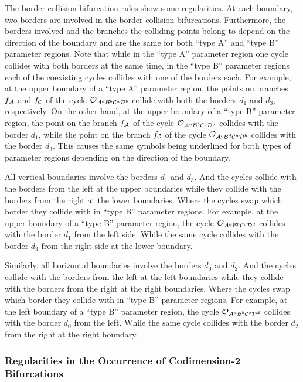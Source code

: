 The border collision bifurcation rules show some regularities.
At each boundary, two borders are involved in the border collision bifurcations.
Furthermore, the borders involved and the branches the colliding points belong to depend on the direction of the boundary and are the same for both ``type A'' and ``type B'' parameter regions.
Note that while in the ``type A'' parameter region one cycle collides with both borders at the same time, in the ``type B'' parameter regions each of the coexisting cycles collides with one of the borders each.
For example, at the upper boundary of a ``type A'' parameter region, the points on branches $f_{\mathcal{A}}$ and $f_{\mathcal{C}}$ of the cycle $\mathcal{O}_{\mathcal{A}^a\mathcal{B}^b\mathcal{C}^a\mathcal{D}^b}$ collide with both the borders $d_1$ and $d_3$, respectively.
On the other hand, at the upper boundary of a ``type B'' parameter region, the point on the branch $f_{\mathcal{A}}$ of the cycle $\mathcal{O}_{\mathcal{A}^a\mathcal{B}^b\mathcal{C}^c\mathcal{D}^d}$ collides with the border $d_1$, while the point on the branch $f_{\mathcal{C}}$ of the cycle $\mathcal{O}_{\mathcal{A}^c\mathcal{B}^d\mathcal{C}^a\mathcal{D}^b}$ collides with the border $d_3$.
This causes the same symbols being underlined for both types of parameter regions depending on the direction of the boundary.

All vertical boundaries involve the borders $d_1$ and $d_3$.
And the cycles collide with the borders from the left at the upper boundaries while they collide with the borders from the right at the lower boundaries.
Where the cycles swap which border they collide with in ``type B'' parameter regions.
For example, at the upper boundary of a ``type B'' parameter region, the cycle $\mathcal{O}_{\mathcal{A}^a\mathcal{B}^b\mathcal{C}^c\mathcal{D}^d}$ collides with the border $d_1$ from the left side.
While the same cycle collides with the border $d_3$ from the right side at the lower boundary.

Similarly, all horizontal boundaries involve the borders $d_0$ and $d_2$.
And the cycles collide with the borders from the left at the left boundaries while they collide with the borders from the right at the right boundaries.
Where the cycles swap which border they collide with in ``type B'' parameter regions.
For example, at the left boundary of a ``type B'' parameter region, the cycle $\mathcal{O}_{\mathcal{A}^a\mathcal{B}^b\mathcal{C}^c\mathcal{D}^d}$ collides with the border $d_0$ from the left.
While the same cycle collides with the border $d_2$ from the right at the right boundary.

\subsubsection{Regularities in the Occurrence of Codimension-2 Bifurcations}

